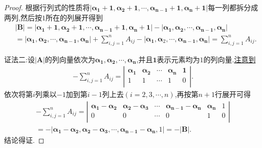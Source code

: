 \documentclass[lang=cn,newtx,10pt,scheme=chinese]{elegantbook}
\begin{document}
\begin{proof}
      根据行列式的性质将\(|\boldsymbol{\alpha}_{\boldsymbol{1}} + \mathbf{1},\boldsymbol{\alpha}_{\boldsymbol{2}} + \mathbf{1},\cdots,\boldsymbol{\alpha}_{\boldsymbol{n-1}} + \mathbf{1},\boldsymbol{\alpha}_{\boldsymbol{n}} + \mathbf{1}|\)每一列都拆分成两列,然后按\(1\)所在的列展开得到
      \begin{align*}
          &|\boldsymbol{B}| = |\boldsymbol{\alpha}_{\boldsymbol{1}} + \mathbf{1},\boldsymbol{\alpha}_{\boldsymbol{2}} + \mathbf{1},\cdots,\boldsymbol{\alpha}_{\boldsymbol{n-1}} + \mathbf{1},\boldsymbol{\alpha}_{\boldsymbol{n}} + \mathbf{1}| - |\boldsymbol{\alpha}_{\boldsymbol{1}},\boldsymbol{\alpha}_{\boldsymbol{2}},\cdots,\boldsymbol{\alpha}_{\boldsymbol{n-1}},\boldsymbol{\alpha}_{\boldsymbol{n}}|
          \\
          &= |\boldsymbol{\alpha}_{\boldsymbol{1}},\boldsymbol{\alpha}_{\boldsymbol{2}},\cdots,\boldsymbol{\alpha}_{\boldsymbol{n-1}},\boldsymbol{\alpha}_{\boldsymbol{n}}| + \sum_{i,j = 1}^{n}A_{ij} - |\boldsymbol{\alpha}_{\boldsymbol{1}},\boldsymbol{\alpha}_2,\cdots,\boldsymbol{\alpha}_{\boldsymbol{n-1}},\boldsymbol{\alpha}_{\boldsymbol{n}}| = \sum_{i,j = 1}^{n}A_{ij}.
      \end{align*}
  
      {\color{blue}证法二:}设\(|\boldsymbol{A}|\)的列向量依次为\(\boldsymbol{\alpha}_{\boldsymbol{1}},\boldsymbol{\alpha}_{\boldsymbol{2}},\cdots,\boldsymbol{\alpha}_{\boldsymbol{n}}\),并且\(\mathbf{1}\)表示元素均为\(1\)的列向量.\hyperref[关于行列式|A|所有代数余子式求和的构造]{注意到}
      \begin{align*}
          -\sum_{i,j=1}^n{A_{ij}}=\left| \begin{matrix}
              \boldsymbol{\alpha }_{\mathbf{1}}&		\boldsymbol{\alpha }_{\mathbf{2}}&		\cdots&		\boldsymbol{\alpha }_{\boldsymbol{n}}&		\mathbf{1}\\
              1&		1&		\cdots&		1&		0\\
          \end{matrix} \right|.
      \end{align*}
      依次将第$i$列乘以$-1$加到第$i-1$列上去$(i=2,3,\cdots,n)$,再按第$n+1$行展开可得
      \begin{align*}
          -\sum_{i,j=1}^n{A_{ij}=\left| \begin{matrix}
              \boldsymbol{\alpha }_{\mathbf{1}}-\boldsymbol{\alpha }_{\mathbf{2}}&		\boldsymbol{\alpha }_{\mathbf{2}}-\boldsymbol{\alpha }_{\mathbf{3}}&		\cdots&		\boldsymbol{\alpha }_{\boldsymbol{n}-\mathbf{1}}-\boldsymbol{\alpha }_{\boldsymbol{n}}&		\boldsymbol{\alpha }_{\boldsymbol{n}}&		1\\
              0&		0&		\cdots&		0&		1&		0\\
          \end{matrix} \right|}
          \\
          =-|\boldsymbol{\alpha }_{\mathbf{1}}-\boldsymbol{\alpha }_{\mathbf{2}},\boldsymbol{\alpha }_{\mathbf{2}}-\boldsymbol{\alpha }_{\mathbf{3}},\cdots ,\boldsymbol{\alpha }_{\boldsymbol{n}-\mathbf{1}}-\boldsymbol{\alpha }_{\boldsymbol{n}},1|=-|\boldsymbol{B}|.
      \end{align*}
      结论得证.
\end{proof}
\end{document}
